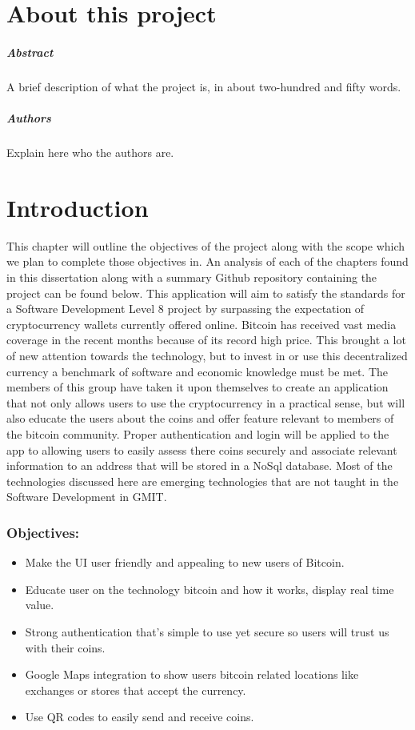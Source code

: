 
\chapter*{About this project}
\paragraph{Abstract}
A brief description of what the project is, in about two-hundred and fifty words.

\paragraph{Authors}
Explain here who the authors are.



\chapter{Introduction}
This chapter will outline the objectives of the project along with the scope which we plan to complete those objectives in. An analysis of each of the chapters found in this dissertation along with a summary Github repository containing the project can be found below. This application will aim to satisfy the standards for a Software Development Level 8 project by surpassing the expectation of cryptocurrency wallets currently offered online. Bitcoin has received vast media coverage in the recent months because of its record high price. This brought a lot of new attention towards the technology, but to invest in or use this decentralized currency a benchmark of software and economic knowledge must be met. The members of this group have taken it upon themselves to create an application that not only allows users to use the cryptocurrency in a practical sense, but will also educate the users about the coins and offer feature relevant to members of the bitcoin community. Proper authentication and login will be applied to the app to allowing users to easily assess there coins securely and associate relevant information to an address that will be stored in a NoSql database. Most of the technologies discussed here are emerging technologies that are not taught in the Software Development in GMIT.

\subsection{Objectives:}
\begin{itemize}
  \item Make the UI user friendly and appealing to new users of Bitcoin.
  \item Educate user on the technology bitcoin and how it works, display real time value.
  \item Strong authentication that’s simple to use yet secure so users will trust us with their coins.
  \item Google Maps integration to show users bitcoin related locations like exchanges or stores that accept the currency.
  \item Use QR codes to easily send and receive coins.
\end{itemize}

